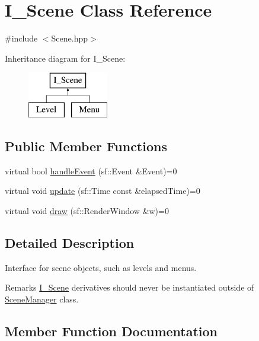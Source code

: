 \hypertarget{class_i___scene}{}\section{I\+\_\+\+Scene Class Reference}
\label{class_i___scene}


{\ttfamily \#include $<$Scene.\+hpp$>$}

Inheritance diagram for I\+\_\+\+Scene\+:\begin{figure}[H]
\begin{center}
\leavevmode
\includegraphics[height=2.000000cm]{class_i___scene}
\end{center}
\end{figure}
\subsection*{Public Member Functions}
\begin{DoxyCompactItemize}
\item 
virtual bool \hyperlink{class_i___scene_a5e7cb2bc39ea754e521d65d0881d4dd4}{handle\+Event} (sf\+::\+Event \&Event)=0
\item 
virtual void \hyperlink{class_i___scene_ada171bbf373154e624f87aa8b7b52f84}{update} (sf\+::\+Time const \&elapsed\+Time)=0
\item 
virtual void \hyperlink{class_i___scene_af21a22b1c85f99443cdf64b12ad57c36}{draw} (sf\+::\+Render\+Window \&w)=0
\end{DoxyCompactItemize}


\subsection{Detailed Description}
Interface for scene objects, such as levels and menus. \begin{DoxyRemark}{Remarks}
\hyperlink{class_i___scene}{I\+\_\+\+Scene} derivatives should never be instantiated outside of \hyperlink{class_scene_manager}{Scene\+Manager} class. 
\end{DoxyRemark}


\subsection{Member Function Documentation}
\hypertarget{class_i___scene_af21a22b1c85f99443cdf64b12ad57c36}{}
